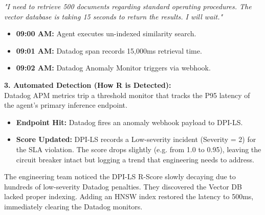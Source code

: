 \documentclass[11pt,a4paper]{article}
\begin{document}
\vspace{0.3cm}
\begin{tcolorbox}[enhanced, colback=gray!5!white, colframe=gray, title={\textbf{\faRobot\ 2. Agent Thought Process \& Timeline}}, fonttitle=\bfseries, boxrule=1pt, arc=2mm]
\textit{"I need to retrieve 500 documents regarding standard operating procedures. The vector database is taking 15 seconds to return the results. I will wait."}
\begin{itemize}
    \item \textbf{09:00 AM:} Agent executes un-indexed similarity search.
    \item \textbf{09:01 AM:} Datadog span records 15,000ms retrieval time.
    \item \textbf{09:02 AM:} Datadog Anomaly Monitor triggers via webhook.
\end{itemize}
\end{tcolorbox}
\vspace{0.3cm}

\textbf{3. Automated Detection (How R is Detected):}\\
Datadog APM metrics trip a threshold monitor that tracks the P95 latency of the agent's primary inference endpoint.

\vspace{0.3cm}
\begin{tcolorbox}[enhanced, colback=blue!5!white, colframe=dpiblue, title={\textbf{\faCogs\ 4. Integration \& Score Downgrade}}, fonttitle=\bfseries, boxrule=1pt, arc=2mm]
\begin{itemize}
    \item \textbf{Endpoint Hit:} Datadog fires an anomaly webhook payload to DPI-LS.
    \item \textbf{Score Updated:} DPI-LS records a Low-severity incident (Severity = 2) for the SLA violation. The score drops slightly (e.g. from 1.0 to 0.95), leaving the circuit breaker intact but logging a trend that engineering needs to address.
\end{itemize}
\end{tcolorbox}
\vspace{0.3cm}


\vspace{0.3cm}
\begin{tcolorbox}[enhanced, colback=green!5!white, colframe=dpigreen, title={\textbf{\faWrench\ 6. Root Cause Analysis \& Resolution}}, fonttitle=\bfseries, boxrule=1pt, arc=2mm]
The engineering team noticed the DPI-LS R-Score slowly decaying due to hundreds of low-severity Datadog penalties. They discovered the Vector DB lacked proper indexing. Adding an HNSW index restored the latency to 500ms, immediately clearing the Datadog monitors.
\end{tcolorbox}
\vspace{0.3cm}
\end{document}
